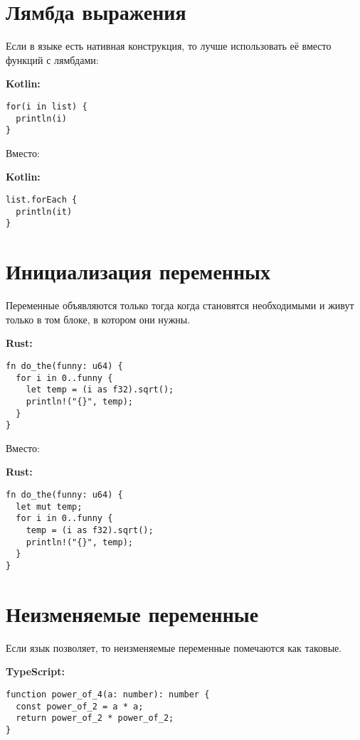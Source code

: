 \documentclass[12p]{article}
\begin{document}
\section{Лямбда выражения}

Если в языке есть нативная конструкция, то лучше использовать её вместо функций с лямбдами:\newline

\textbf{Kotlin:}
\begin{verbatim}
for(i in list) {
  println(i)
}
\end{verbatim}

Вместо:\newline

\textbf{Kotlin:}
\begin{verbatim}
list.forEach {
  println(it)
}
\end{verbatim}
\pagebreak

\section{Инициализация переменных}

Переменные объявляются только тогда когда становятся необходимыми и живут только в том блоке, в котором они нужны.\newline

\textbf{Rust:}
\begin{verbatim}
fn do_the(funny: u64) {
  for i in 0..funny {
    let temp = (i as f32).sqrt();
    println!("{}", temp);
  }
}
\end{verbatim}

Вместо:\newline

\textbf{Rust:}
\begin{verbatim}
fn do_the(funny: u64) {
  let mut temp;
  for i in 0..funny {
    temp = (i as f32).sqrt();
    println!("{}", temp);
  }
}
\end{verbatim}

\section{Неизменяемые переменные}

Если язык позволяет, то неизменяемые переменные помечаются как таковые.\newline

\textbf{TypeScript:}
\begin{verbatim}
function power_of_4(a: number): number {
  const power_of_2 = a * a;
  return power_of_2 * power_of_2;
}
\end{verbatim}
\pagebreak
\end{document}
